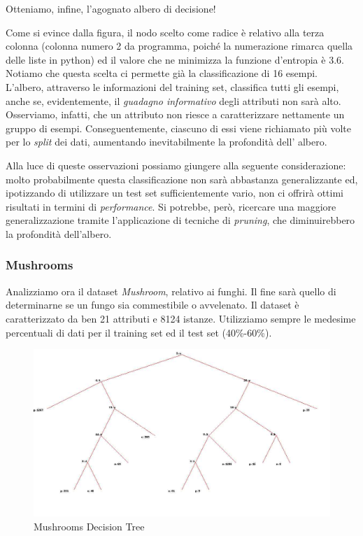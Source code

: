 			Otteniamo, infine, l'agognato albero di decisione!\par
			Come si evince dalla figura, il nodo scelto come radice è relativo alla terza colonna (colonna numero 2 da programma, poiché la numerazione rimarca quella delle liste in python) ed il valore che ne minimizza la funzione d'entropia è 3.6. Notiamo che questa scelta ci permette già la classificazione di 16 esempi.
			L'albero, attraverso le informazioni del training set, classifica tutti gli esempi, anche se, evidentemente, il \emph{guadagno informativo} degli attributi non sarà alto. Osserviamo, infatti, che un attributo non riesce a caratterizzare nettamente un gruppo di esempi. Conseguentemente, ciascuno di essi viene richiamato più volte per lo \emph{split} dei dati, aumentando inevitabilmente la profondità dell' albero.\par
			Alla luce di queste osservazioni possiamo giungere alla seguente considerazione: molto probabilmente questa classificazione non sarà abbastanza generalizzante ed, ipotizzando di utilizzare un test set sufficientemente vario, non ci offrirà ottimi risultati in termini di \emph{performance}. Si potrebbe, però, ricercare una maggiore generalizzazione tramite l'applicazione di tecniche di \emph{pruning}, che diminuirebbero la profondità dell'albero.\par
		\subsubsection{Mushrooms} 
			Analizziamo ora il dataset \emph{Mushroom}, relativo ai funghi. Il fine sarà quello di determinarne se un fungo sia commestibile o avvelenato. Il dataset è caratterizzato da ben 21 attributi e 8124 istanze. Utilizziamo sempre le medesime percentuali di dati per il training set ed il test set (40\%-60\%).
			
			\begin{figure}
				\includegraphics[width=1.2\textwidth, height=0.9\textheight]{mushroom.jpg}
				\caption{Mushrooms Decision Tree}
				\label{fig:mus-dt}
			\end{figure}
			

